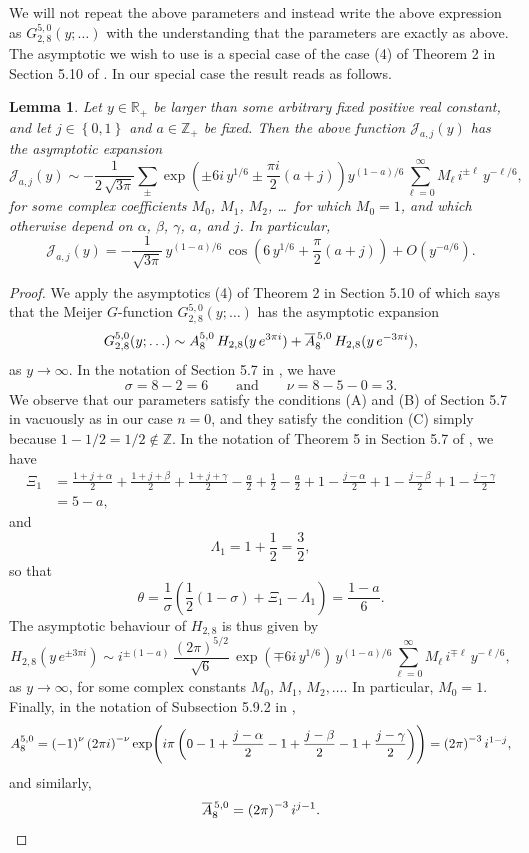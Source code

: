 \documentclass[a4paper,10pt,twoside]{amsart}
\newtheorem{lemma}[theorem]{Lemma}
\theoremstyle{definition}
\numberwithin{equation}{section}
\renewcommand\:{\colon}
\begin{document}
We will not repeat the above parameters and instead write the above expression as $G^{5,0}_{2,8}(y;\ldots)$ with the understanding that the parameters are exactly as above. The asymptotic we wish to use is a special case of the case (4) of Theorem 2 in Section 5.10 of \cite{Luke1}. In our special case the result reads as follows.
\begin{lemma}\label{j-asymptotics}
Let $y\in\mathbb R_+$ be larger than some arbitrary fixed positive real constant, and let $j\in\left\{0,1\right\}$ and $a\in\mathbb Z_+$ be fixed. Then the above function $\mathscr J_{a,j}(y)$ has the asymptotic expansion
\[\mathscr J_{a,j}(y)
\sim-\frac{1}{2\,\sqrt{3\pi}}\sum_\pm\exp\!\left(\pm6i\,y^{1/6}\pm\frac{\pi i}2\left(a+j\right)\right)y^{\left(1-a\right)/6}\sum_{\ell=0}^\infty M_\ell\,i^{\pm\ell}\,y^{-\ell/6},\]
for some complex coefficients $M_0$, $M_1$, $M_2$, \dots\ for which $M_0=1$, and which otherwise depend on $\alpha$, $\beta$, $\gamma$, $a$, and $j$.
In particular,
\[
\mathscr J_{a,j}(y)
=-\frac1{\sqrt{3\pi}}\,y^{(1-a)/6}\,\cos\!\left(6\,y^{1/6}+\frac\pi2\left(a+j\right)\right)
+O(y^{-a/6}).
\]
\end{lemma}

\begin{proof}
We apply the asymptotics (4) of Theorem 2 in Section 5.10 of \cite{Luke1} which says that the Meijer $G$-function $G^{5,0}_{2,8}(y;\ldots)$ has the asymptotic expansion
\[G^{5,0}_{2,8}(y;\ldots)\sim
A^{5,0}_8\,H_{2,8}(y\,e^{3\pi i})+\smash{\overline A}\vphantom A^{\,5,0}_8\,H_{2,8}(y\,e^{-3\pi i}),\]
as $y\longrightarrow\infty$. In the notation of Section 5.7 in \cite{Luke1}, we have
\[\sigma=8-2=6\qquad\text{and}\qquad\nu=8-5-0=3.\]
We observe that our parameters satisfy the conditions (A) and (B) of Section 5.7 in \cite{Luke1} vacuously as in our case $n=0$, and they satisfy the condition (C) simply because $1-1/2=1/2\not\in\mathbb Z$.
In the notation of Theorem 5 in Section 5.7 of \cite{Luke1}, we have
\begin{align*}
\Xi_1 &=\frac{1+j+\alpha}2+\frac{1+j+\beta}2+\frac{1+j+\gamma}2-\frac a2+\frac12-\frac a2+1-\frac{j-\alpha}2+1-\frac{j-\beta}2+1-\frac{j-\gamma}2\\
&=5-a,
\end{align*}
and
\[\Lambda_1=1+\frac12=\frac32,\]
so that
\[\theta=\frac1\sigma\left(\frac12\left(1-\sigma\right)+\Xi_1-\Lambda_1\right)
=\frac{1-a}6.\]
The asymptotic behaviour of $H_{2,8}$ is thus given by
\[H_{2,8}(y\,e^{\pm3\pi i})\sim i^{\pm\left(1-a\right)}\,\frac{\left(2\pi\right)^{5/2}}{\sqrt6}\,\exp(\mp6i\,y^{1/6})\,y^{(1-a)/6}\sum_{\ell=0}^\infty M_\ell\,i^{\mp\ell}\,y^{-\ell/6},\]
as $y\longrightarrow\infty$,
for some complex constants $M_0$, $M_1$, $M_2,\dots$. In particular, $M_0=1$.
Finally, in the notation of Subsection 5.9.2 in \cite{Luke1},
\[A^{5,0}_8=\left(-1\right)^\nu\left(2\pi i\right)^{-\nu}\exp\!\left(i\pi\vphantom{\Bigg|}\left(0-1+\frac{j-\alpha}2-1+\frac{j-\beta}2-1+\frac{j-\gamma}2\right)\right)
=\left(2\pi\right)^{-3}i^{1-j},\]
and similarly,
\[\smash{\overline A}\vphantom A^{\,5,0}_8
=\left(2\pi\right)^{-3}i^{j-1}.\qedhere\]
\end{proof}
\end{document}
